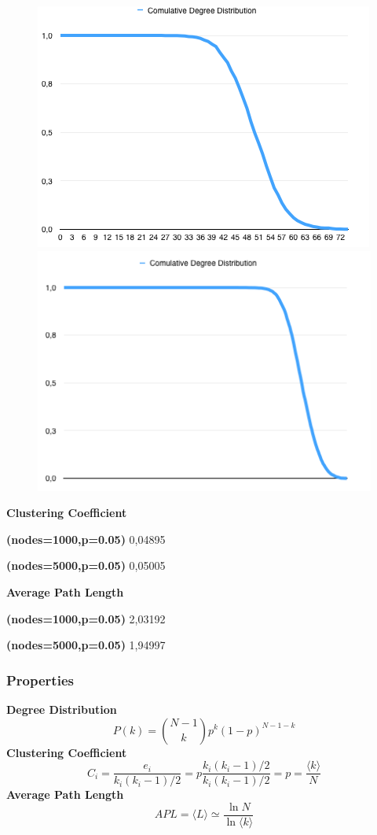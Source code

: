 \documentclass[a4paper,titlepage,11pt]{article}
\begin{document}
\begin{figure}[h]
    \centering
    \includegraphics[scale=0.50]{img/cdd-1000-05.png}
    \includegraphics[scale=0.50]{img/cdd-5000-05.png}
\end{figure}

\begin{multicols}{2}

  \textbf{Clustering Coefficient}

  \textbf{(nodes=1000,p=0.05)} 0,04895

  \textbf{(nodes=5000,p=0.05)} 0,05005

\columnbreak

  \textbf{Average Path Length}

  \textbf{(nodes=1000,p=0.05)} 2,03192

  \textbf{(nodes=5000,p=0.05)} 1,94997

\end{multicols}

\subsubsection{Properties}
\textbf{Degree Distribution}
\[
  P(k) = {{N-1}\choose{k}} p^{k}(1-p)^{N-1-k}
\]
\textbf{Clustering Coefficient}
\[
  C_i = \frac{e_i}{k_i(k_i-1)/2} = p \frac{k_i(k_i-1)/2}{k_i(k_i-1)/2} = p = \frac{\langle k\rangle}{N}
\]
\textbf{Average Path Length}
\[
  APL = \langle L\rangle \simeq \frac{\ln{N}}{\ln{\langle k\rangle}}
\]
\end{document}
